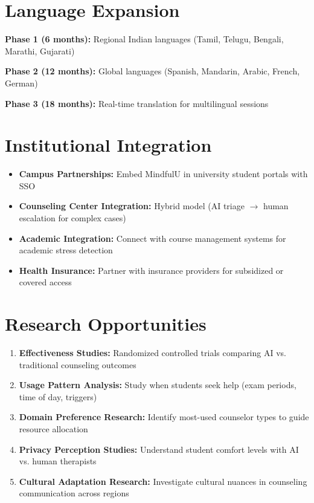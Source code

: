 \documentclass[11pt,a4paper]{report}
\begin{document}
\section{Language Expansion}
\textbf{Phase 1 (6 months):} Regional Indian languages (Tamil, Telugu, Bengali, Marathi, Gujarati)

\textbf{Phase 2 (12 months):} Global languages (Spanish, Mandarin, Arabic, French, German)

\textbf{Phase 3 (18 months):} Real-time translation for multilingual sessions

\section{Institutional Integration}
\begin{itemize}
    \item \textbf{Campus Partnerships:} Embed MindfulU in university student portals with SSO
    \item \textbf{Counseling Center Integration:} Hybrid model (AI triage $\rightarrow$ human escalation for complex cases)
    \item \textbf{Academic Integration:} Connect with course management systems for academic stress detection
    \item \textbf{Health Insurance:} Partner with insurance providers for subsidized or covered access
\end{itemize}

\section{Research Opportunities}
\begin{enumerate}
    \item \textbf{Effectiveness Studies:} Randomized controlled trials comparing AI vs. traditional counseling outcomes
    \item \textbf{Usage Pattern Analysis:} Study when students seek help (exam periods, time of day, triggers)
    \item \textbf{Domain Preference Research:} Identify most-used counselor types to guide resource allocation
    \item \textbf{Privacy Perception Studies:} Understand student comfort levels with AI vs. human therapists
    \item \textbf{Cultural Adaptation Research:} Investigate cultural nuances in counseling communication across regions
\end{enumerate}
\end{document}
